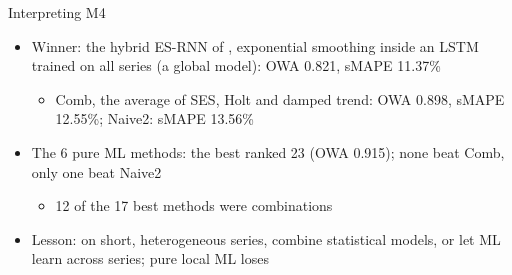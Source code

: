 \begin{frame}{Interpreting M4}
\itemsize{\small}
\begin{itemize}
    \item Winner: the hybrid ES-RNN of , exponential smoothing inside an LSTM trained on all series (a global model): OWA 0.821, sMAPE 11.37\%
    \begin{itemize}
        \item Comb, the average of SES, Holt and damped trend: OWA 0.898, sMAPE 12.55\%; Naive2: sMAPE 13.56\%
    \end{itemize}
    \item The 6 pure ML methods: the best ranked 23 (OWA 0.915); none beat Comb, only one beat Naive2 
    \begin{itemize}
        \item 12 of the 17 best methods were combinations
    \end{itemize}
    \item Lesson: on short, heterogeneous series, combine statistical models, or let ML learn across series; pure local ML loses
\end{itemize}
\end{frame}

